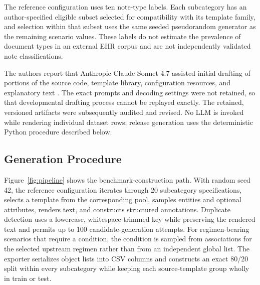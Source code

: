 \documentclass[conference]{IEEEtran}
\begin{document}
The reference configuration uses ten note-type labels. Each subcategory has an
author-specified eligible subset selected for compatibility with its template
family, and selection within that subset uses the same seeded pseudorandom
generator as the remaining scenario values. These labels do not estimate the
prevalence of document types in an external EHR corpus and are not independently
validated note classifications.

The authors report that Anthropic Claude Sonnet 4.7 assisted initial drafting
of portions of the source code, template library, configuration resources, and
explanatory text \cite{anthropic2026}. The exact prompts and decoding settings
were not retained, so that developmental drafting process cannot be replayed
exactly. The retained, versioned artifacts were subsequently audited and
revised. No LLM is invoked while rendering individual dataset rows; release
generation uses the deterministic Python procedure described below.

\subsection{Generation Procedure}

Figure~\ref{fig:pipeline} shows the benchmark-construction path. With random
seed 42, the reference configuration iterates through 20 subcategory
specifications, selects a template from the corresponding pool, samples
entities and optional attributes, renders text, and constructs structured
annotations. Duplicate detection uses a lowercase, whitespace-trimmed key while
preserving the rendered text and permits up to 100 candidate-generation
attempts. For regimen-bearing scenarios that require a condition, the
condition is sampled from associations for the selected upstream regimen rather
than from an independent global list. The exporter serializes object lists into CSV columns
and constructs an exact 80/20 split within every subcategory while keeping each
source-template group wholly in train or test.
\end{document}
